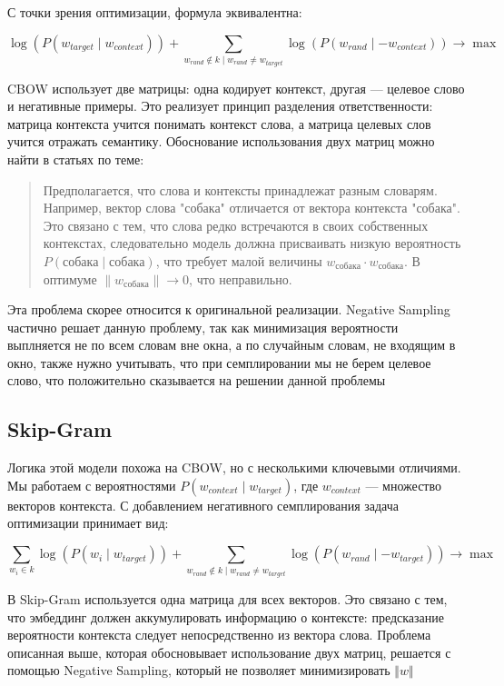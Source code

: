 \documentclass{article}
\begin{document}
    С точки зрения оптимизации, формула эквивалентна:  
    
    \[
    \log(P(w_{target} \mid w_{context})) + \sum_{w_{rand} \notin k \mid w_{rand} \neq w_{target}} \log(P(w_{rand} \mid -w_{context})) \rightarrow \max
    \]  
    
    CBOW использует две матрицы: одна кодирует контекст, другая — целевое слово и негативные примеры. Это реализует принцип разделения ответственности:  
    матрица контекста учится понимать контекст слова, а матрица целевых слов учится отражать семантику.  
    Обоснование использования двух матриц можно найти в статьях по теме:  
    
    \begin{quote}  
    Предполагается, что слова и контексты принадлежат разным словарям. 
    Например, вектор слова "собака" отличается от вектора контекста "собака". 
    Это связано с тем, что слова редко встречаются в своих собственных контекстах, 
    следовательно модель должна присваивать 
    низкую вероятность \( P(\text{собака} \mid \text{собака}) \), что требует 
    малой величины \( w_{собака} \cdot w_{собака} \). В оптимуме \( \|w_{собака}\| \rightarrow 0 \), что неправильно.  
    \end{quote}  

    Эта проблема скорее относится к оригинальной реализации. Negative Sampling частично решает данную проблему, так как минимизация вероятности выплняется не по всем словам вне окна, а по случайным словам, не 
    входящим в окно, также нужно учитывать, что при семплировании мы не берем целевое слово, что положительно сказывается на решении данной проблемы
    
    \subsection{Skip-Gram}  
    Логика этой модели похожа на CBOW, 
    но с несколькими ключевыми отличиями. 
    Мы работаем с вероятностями \( P(w_{context} \mid w_{target}) \), где \( w_{context} \) — множество векторов контекста.
    С добавлением негативного семплирования задача оптимизации принимает вид:  
    
    \[
    \sum_{w_i \in k} \log(P(w_i \mid w_{target})) + \sum_{w_{rand} \notin k \mid w_{rand} \neq w_{target}} \log(P(w_{rand} \mid -w_{target})) \rightarrow \max
    \]  
    
    В Skip-Gram используется одна матрица для всех векторов. Это связано с тем, что эмбеддинг должен аккумулировать информацию о контексте: предсказание вероятности контекста следует непосредственно из вектора слова.
    Проблема описанная выше, которая обосновывает использование двух матриц, решается с помощью Negative Sampling, который не позволяет минимизировать $\Vert w \Vert$
\end{document}
